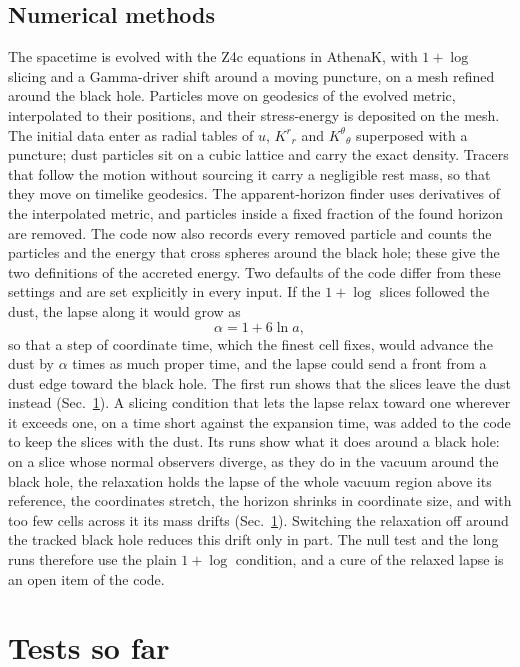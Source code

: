 \documentclass[aps,prd,twocolumn,10pt,superscriptaddress,nofootinbib,longbibliography,floatfix]{revtex4-2}
\begin{document}
\subsection{Numerical methods}

The spacetime is evolved with the Z4c equations in AthenaK, with $1+\log$ slicing and a Gamma-driver shift around a moving puncture, on a mesh refined around the black hole. Particles move on geodesics of the evolved metric, interpolated to their positions, and their stress-energy is deposited on the mesh. The initial data enter as radial tables of $u$, $K^r{}_r$ and $K^\theta{}_\theta$ superposed with a puncture; dust particles sit on a cubic lattice and carry the exact density. Tracers that follow the motion without sourcing it carry a negligible rest mass, so that they move on timelike geodesics. The apparent-horizon finder uses derivatives of the interpolated metric, and particles inside a fixed fraction of the found horizon are removed. The code now also records every removed particle and counts the particles and the energy that cross spheres around the black hole; these give the two definitions of the accreted energy. Two defaults of the code differ from these settings and are set explicitly in every input. If the $1+\log$ slices followed the dust, the lapse along it would grow as
\begin{equation}
\alpha=1+6\ln a,
\end{equation}
so that a step of coordinate time, which the finest cell fixes, would advance the dust by $\alpha$ times as much proper time, and the lapse could send a front from a dust edge toward the black hole. The first run shows that the slices leave the dust instead (Sec.~\ref{sec:tests}). A slicing condition that lets the lapse relax toward one wherever it exceeds one, on a time short against the expansion time, was added to the code to keep the slices with the dust. Its runs show what it does around a black hole: on a slice whose normal observers diverge, as they do in the vacuum around the black hole, the relaxation holds the lapse of the whole vacuum region above its reference, the coordinates stretch, the horizon shrinks in coordinate size, and with too few cells across it its mass drifts (Sec.~\ref{sec:tests}). Switching the relaxation off around the tracked black hole reduces this drift only in part. The null test and the long runs therefore use the plain $1+\log$ condition, and a cure of the relaxed lapse is an open item of the code.

\section{Tests so far}\label{sec:tests}
\end{document}
